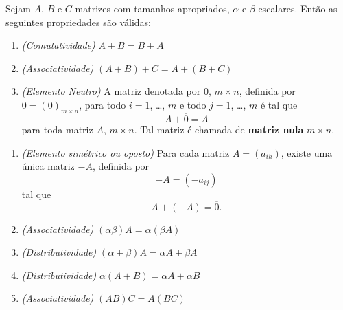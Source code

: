 \documentclass{beamer}
\begin{document}
  \begin{frame}
   \begin{teorema}
      Sejam $A$, $B$ e $C$ matrizes com tamanhos apropriados, $\alpha$ e $\beta$ escalares. Então as seguintes propriedades são válidas:
      \begin{enumerate}[label={\arabic*})]
        \item \textit{(Comutatividade)} $A + B = B + A$

        \item \textit{(Associatividade)} $(A + B) + C = A + (B + C)$

        \item \textit{(Elemento Neutro)} A matriz denotada por $\overline{0}$, $m \times n$, definida por $\overline{0} = (0)_{m \times n}$, para todo $i = 1$, \dots, $m$
        e todo $j = 1$, \dots, $m$ é tal que
        \[
          A + \overline{0} = A
        \]
        para toda matriz $A$, $m \times n$. Tal matriz é chamada de \textbf{matriz nula} $m \times n$.
        \seti
      \end{enumerate}
    \end{teorema}
  \end{frame}

  \begin{frame}
    \begin{teorema}
      \begin{enumerate}[label={\arabic*)}]
        \conti

        \item \textit{(Elemento simétrico ou oposto)} Para cada matriz $A = (a_{ih})$, existe uma única matriz $-A$, definida por
          \[ -A = (-a_{ij})\]
        tal que
        \[ A + (-A) = \overline{0}.\]

        \item \textit{(Associatividade)} $(\alpha\beta)A = \alpha(\beta A)$

        \item \textit{(Distributividade)} $(\alpha + \beta)A = \alpha A + \beta A$

        \item \textit{(Distributividade)} $\alpha(A + B) = \alpha A + \alpha B$

        \item \textit{(Associatividade)} $(AB)C = A(BC)$
        \seti
      \end{enumerate}
    \end{teorema}
  \end{frame}
\end{document}
